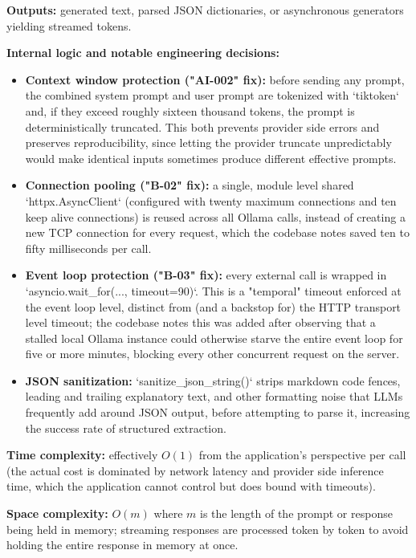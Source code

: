 \documentclass[11pt,a4paper]{report}
\begin{document}
\textbf{Outputs:} generated text, parsed JSON dictionaries, or asynchronous generators yielding streamed tokens.

\textbf{Internal logic and notable engineering decisions:}
\begin{itemize}[leftmargin=*]
  \item \textbf{Context window protection ("AI-002" fix):} before sending any prompt, the combined system prompt and user prompt are tokenized with `tiktoken` and, if they exceed roughly sixteen thousand tokens, the prompt is deterministically truncated. This both prevents provider side errors and preserves reproducibility, since letting the provider truncate unpredictably would make identical inputs sometimes produce different effective prompts.
  \item \textbf{Connection pooling ("B-02" fix):} a single, module level shared `httpx.AsyncClient` (configured with twenty maximum connections and ten keep alive connections) is reused across all Ollama calls, instead of creating a new TCP connection for every request, which the codebase notes saved ten to fifty milliseconds per call.
  \item \textbf{Event loop protection ("B-03" fix):} every external call is wrapped in `asyncio.wait_for(..., timeout=90)`. This is a "temporal" timeout enforced at the event loop level, distinct from (and a backstop for) the HTTP transport level timeout; the codebase notes this was added after observing that a stalled local Ollama instance could otherwise starve the entire event loop for five or more minutes, blocking every other concurrent request on the server.
  \item \textbf{JSON sanitization:} `sanitize_json_string()` strips markdown code fences, leading and trailing explanatory text, and other formatting noise that LLMs frequently add around JSON output, before attempting to parse it, increasing the success rate of structured extraction.
\end{itemize}

\textbf{Time complexity:} effectively $O(1)$ from the application's perspective per call (the actual cost is dominated by network latency and provider side inference time, which the application cannot control but does bound with timeouts).

\textbf{Space complexity:} $O(m)$ where $m$ is the length of the prompt or response being held in memory; streaming responses are processed token by token to avoid holding the entire response in memory at once.
\end{document}
